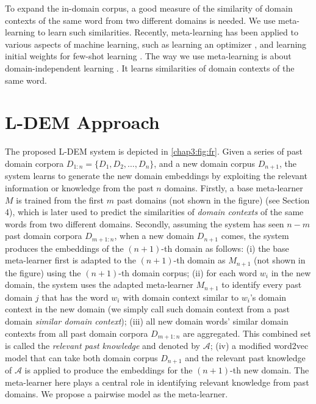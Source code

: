 To expand the in-domain corpus, a good measure of the similarity of domain contexts of the same word from two different domains is needed.
We use meta-learning \cite{thrun2012learning} to learn such similarities.
Recently, meta-learning has been applied to various aspects of machine learning, 
such as learning an optimizer \cite{andrychowicz2016learning},
and learning initial weights for few-shot learning \cite{finn2017model}.
The way we use meta-learning is about domain-independent learning \cite{JMLR:v17:15-239}. It learns similarities of domain contexts of the same word.

\section{L-DEM Approach}
\label{chap3:sec:ldem}

The proposed L-DEM system is depicted in \ref{chap3:fig:fr}.
Given a series of past domain corpora $D_{1:n}=\{D_1, D_2, \dots, D_n\}$, and a new domain corpus $D_{n+1}$, the system learns to generate the new domain embeddings by exploiting the relevant information or knowledge from the past $n$ domains.
Firstly, a base meta-learner $M$ is trained from the first $m$ past domains (not shown in the figure) (see Section 4), which is later used to predict the similarities of \emph{domain contexts} of the same words from two different domains.
Secondly, assuming the system has seen $n-m$ past domain corpora $D_{m+1:n}$, when a new domain $D_{n+1}$ comes, the system produces the embeddings of the $(n+1)$-th domain as follows:
(i) the base meta-learner first is adapted to the $(n+1)$-th domain as $M_{n+1}$ (not shown in the figure) using the $(n+1)$-th domain corpus;
(ii) for each word $w_{i}$ in the new domain, the system uses the adapted meta-learner $M_{n+1}$ to identify every past domain $j$ that has the word $w_{i}$ with domain context similar to $w_{i}$'s domain context in the new domain (we simply call such domain context from a past domain \emph{similar domain context});
(iii) all new domain words' similar domain contexts from all past domain corpora $D_{m+1:n}$ are aggregated. This combined set is called the \textit{relevant past knowledge} and denoted by $\mathcal{A}$;
(iv) a modified word2vec model that can take both domain corpus $D_{n+1}$ and the relevant past knowledge of $\mathcal{A}$ is applied to produce the embeddings for the $(n+1)$-th new domain.
The meta-learner here plays a central role in identifying relevant knowledge from past domains.
We propose a pairwise model as the meta-learner. 

